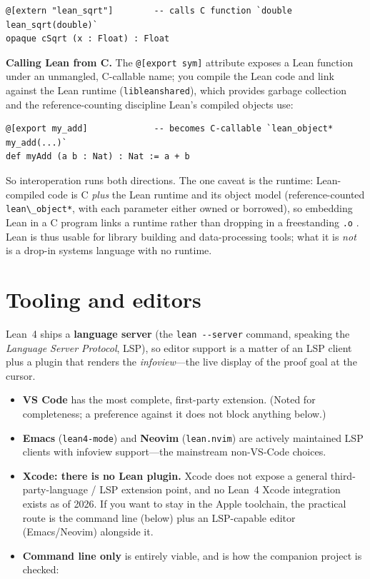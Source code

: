 \documentclass[11pt]{article}
\newcommand{\code}[1]{\lstinline[basicstyle=\ttfamily]|#1|}
\begin{document}
\begin{lstlisting}
@[extern "lean_sqrt"]        -- calls C function `double lean_sqrt(double)`
opaque cSqrt (x : Float) : Float
\end{lstlisting}

\noindent \textbf{Calling Lean from C.} The \code{@[export sym]} attribute
exposes a Lean function under an unmangled, C-callable name; you compile the Lean
code and link against the Lean runtime (\texttt{libleanshared}), which provides
garbage collection and the reference-counting discipline Lean's compiled objects
use:

\begin{lstlisting}
@[export my_add]             -- becomes C-callable `lean_object* my_add(...)`
def myAdd (a b : Nat) : Nat := a + b
\end{lstlisting}

\noindent So interoperation runs both directions. The one caveat is the runtime:
Lean-compiled code is C \emph{plus} the Lean runtime and its object model
(reference-counted \code{lean\_object*}, with each parameter either owned or
borrowed), so embedding Lean in a C program links a runtime rather
than dropping in a freestanding \code{.o} \cite{lean-ffi}. Lean is thus usable
for library building and data-processing tools; what it is \emph{not} is a
drop-in systems language with no runtime.

\section{Tooling and editors}\label{sec:tooling}
Lean~4 ships a \textbf{language server} (the \code{lean --server} command,
speaking the \emph{Language Server Protocol}, LSP), so editor support is a matter
of an LSP client plus a plugin that renders the \emph{infoview}---the live
display of the proof goal at the cursor.

\begin{itemize}[leftmargin=1.4em,itemsep=2pt]
  \item \textbf{VS Code} has the most complete, first-party extension. (Noted
    for completeness; a preference against it does not block anything below.)
  \item \textbf{Emacs} (\code{lean4-mode}) and \textbf{Neovim}
    (\code{lean.nvim}) are actively maintained LSP clients with infoview
    support---the mainstream non-VS-Code choices.
  \item \textbf{Xcode: there is no Lean plugin.} Xcode does not expose a
    general third-party-language / LSP extension point, and no Lean~4 Xcode
    integration exists as of 2026. If you want to stay in the Apple toolchain,
    the practical route is the command line (below) plus an LSP-capable editor
    (Emacs/Neovim) alongside it.
  \item \textbf{Command line only} is entirely viable, and is how the companion
    project is checked:
\end{itemize}
\end{document}
